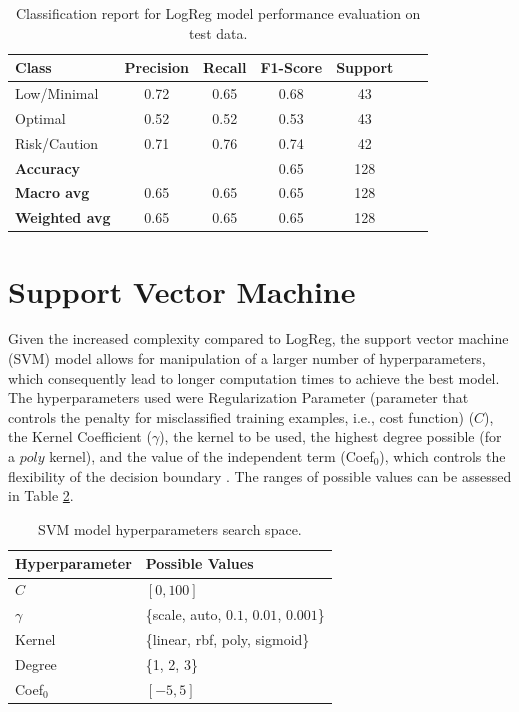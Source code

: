 \documentclass[conference]{IEEEtran}
\begin{document}
\begin{table}[H]
\centering
\caption{Classification report for LogReg model performance evaluation on test data.}
\label{crTestLogREg}
\begin{tabular}{lcccccc}
\toprule
\textbf{Class} & \textbf{Precision} & \textbf{Recall} & \textbf{F1-Score} & \textbf{Support} \\
\midrule
Low/Minimal & 0.72 & 0.65 & 0.68 & 43 \\
Optimal & 0.52 & 0.52 & 0.53 & 43 \\
Risk/Caution & 0.71 & 0.76 & 0.74 & 42 \\
\midrule
\textbf{Accuracy} &  &  & 0.65 & 128 \\
\textbf{Macro avg} & 0.65 & 0.65 & 0.65 & 128 \\
\textbf{Weighted avg} & 0.65 & 0.65 & 0.65 & 128 \\
\bottomrule
\end{tabular}
\end{table} %

\section{Support Vector Machine}

Given the increased complexity compared to LogReg, the support vector machine (SVM) model allows for manipulation of a larger number of hyperparameters, which consequently lead to longer computation times to achieve the best model. The hyperparameters used were Regularization Parameter (parameter that controls the penalty for misclassified training examples, i.e., cost function) ($C$), the Kernel Coefficient ($\gamma$), the kernel to be used, the highest degree possible (for a $poly$ kernel), and the value of the independent term (Coef$_0$), which controls the flexibility of the decision boundary \cite{svm24}. The ranges of possible values can be assessed in Table \ref{parametrosSVM}.

\begin{table}[H]
\centering
\caption{SVM model hyperparameters search space.}
\label{parametrosSVM}
\begin{tabular}{ll}
\toprule
\textbf{Hyperparameter} & \textbf{Possible Values} \\
\midrule
$C$ & $[0, 100]$ \\ 
$\gamma$ & \{scale, auto, $0.1$, $0.01$, $0.001$\} \\ 
Kernel & \{linear, rbf, poly, sigmoid\} \\ 
Degree & \{1, 2, 3\} \\ 
Coef$_0$ & $[-5, 5]$ \\
\bottomrule
\end{tabular}
\end{table} %
\end{document}
